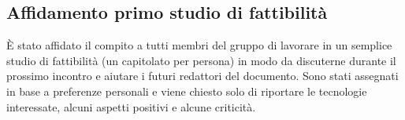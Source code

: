\subsection{Affidamento primo studio di fattibilità}
È stato affidato il compito a tutti membri del gruppo di lavorare in un semplice studio di fattibilità (un capitolato per persona) in modo da discuterne durante il prossimo incontro e aiutare i futuri redattori del documento. Sono stati assegnati in base a preferenze personali e viene chiesto solo di riportare le tecnologie interessate, alcuni aspetti positivi e alcune criticità.